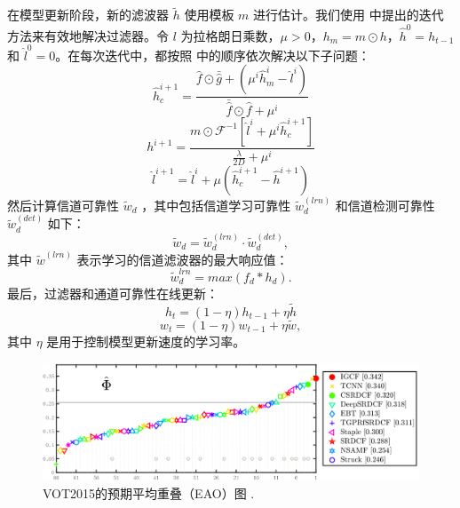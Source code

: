 在模型更新阶段，新的滤波器 $\tilde{h}$ 使用模板 $m$ 进行估计。我们使用 \cite{Lukezic2017DiscriminativeCF} 中提出的迭代方法来有效地解决过滤器。令 $l$ 为拉格朗日乘数，$\mu > 0$，$h_m=m \odot h$，$\hat{h}^0 = h_{t-1}$ 和 $\hat{l}^0 = 0$。在每次迭代中，都按照 \cite{Lukezic2017DiscriminativeCF}中的顺序依次解决以下子问题：
\begin{equation} \label{eq:h1}
\hat{h}_c^{i+1} = \frac{\hat{f} \odot \bar{\hat{g}} +(\mu^i \hat{h}_m^i - \hat{l}^i)}{\bar{\hat{f}} \odot \hat f + \mu^i}
\end{equation}
\begin{equation}
h^{i+1} = \frac{m \odot \mathcal{F}^{-1}[\hat{l}^i + \mu^i\hat{h}_c^{i+1}]}{\frac{\lambda}{2D} + \mu^i}
\end{equation}
\begin{equation} \label{eq:h3}
\hat{l}^{i+1} = \hat{l}^i + \mu(\hat{h}_c^{i+1} - \hat{h}^{i+1})
\end{equation}
然后计算信道可靠性 $\tilde w_d$ \cite{Lukezic2017DiscriminativeCF} ，其中包括信道学习可靠性 $\tilde w_d^{(lrn)}$ 和信道检测可靠性 $\tilde w_d^{(det)}$ 如下： 
\begin{equation} \label{eq:c}
\tilde w_d = \tilde w_d^{(lrn)} \cdot \tilde w_d^{(det)},
\end{equation}
其中 $\tilde{w}^{(lrn)}$ 表示学习的信道滤波器的最大响应值：
\begin{equation} \label{eq:lrn}
\tilde{w}_d^{lrn} = max(f_d * h_d).
\end{equation}
最后，过滤器和通道可靠性在线更新：\begin{equation} \label{eq:update1}
h_t = (1 - \eta)h_{t-1} + \eta \tilde{h}
\end{equation}
\begin{equation} \label{eq:update2}
w_t = (1-\eta)w_{t-1} + \eta \tilde{w},
\end{equation}
其中 $\eta$ 是用于控制模型更新速度的学习率。

\begin{figure}
    \centering
    \includegraphics[width=1.0\textwidth]{Img/IGCF/vot/eao_rank_vot2015.png}
    \caption{VOT2015的预期平均重叠（EAO）图 \cite{Kristan2015TheVO}.}
    \label{fig:vot15}
\end{figure}

